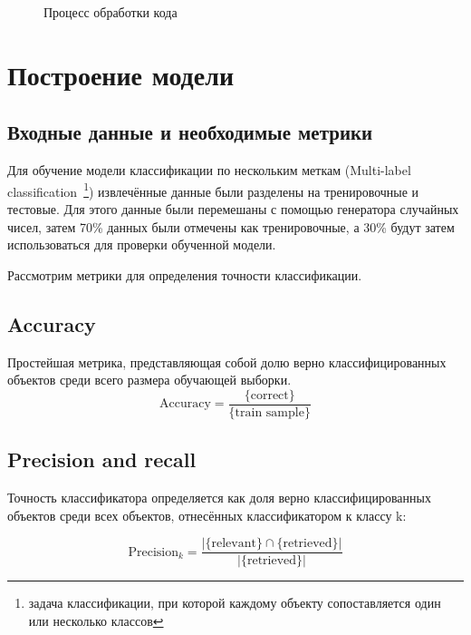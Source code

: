 \documentclass[14pt]{matmex-diploma-custom}
\begin{document}
\begin{figure}[!htb]
\caption{Процесс обработки кода}
\label{ast}
\end{figure}

\section{Построение модели}
\subsection{Входные данные и необходимые метрики}
Для обучение модели классификации по нескольким меткам (Multi-label classification~\footnote{задача классификации, при которой каждому объекту сопоставляется один или несколько классов}) извлечённые данные были разделены на тренировочные и тестовые. Для этого данные были перемешаны с помощью генератора случайных чисел, затем 70\% данных были отмечены как тренировочные, а 30\% будут затем использоваться для проверки обученной модели.

Рассмотрим метрики для определения точности классификации.

\subsection*{Accuracy}

Простейшая метрика, представляющая собой долю верно классифицированных объектов среди всего размера обучающей выборки.
\[
\text{Accuracy}=\frac{\{\text{correct}\}}{\{\text{train sample}\}}
\]

\subsection*{Precision and recall}

Точность классификатора определяется как доля верно классифицированных объектов среди всех объектов, отнесённых классификатором к классу k:

\[
\text{Precision}_{k}=\frac{|\{\text{relevant}\}\cap\{\text{retrieved}\}|}{|\{\text{retrieved}\}|}
\]
\end{document}
